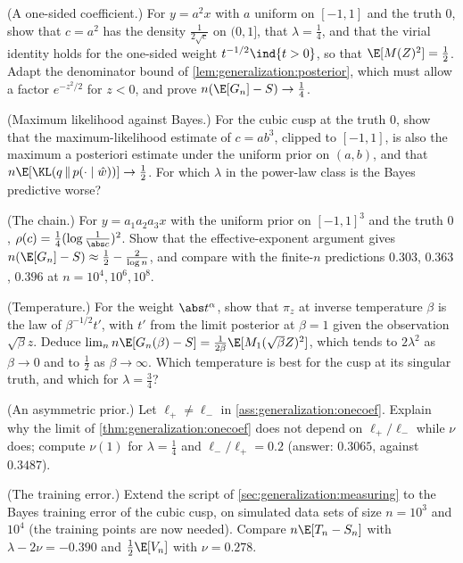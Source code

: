 \begin{refsection}
\begin{exercises}
\item \byhand (A one-sided coefficient.) For $y=a^2x$ with $a$ uniform on $[-1,1]$ and the truth $0$, show that $c=a^2$ has the density $\frac1{2\sqrt c}$ on $(0,1]$, that $\lambda=\frac14$, and that the virial identity holds for the one-sided weight $t^{-1/2}\ind\{t>0\}$, so that $\E[M(Z)^2]=\frac12$. \hard{} Adapt the denominator bound of \cref{lem:generalization:posterior}, which must allow a factor $e^{-z^2/2}$ for $z<0$, and prove $n(\E[G_n]-S)\to\frac14$. \label{ex:generalization:onesided}

\item \byhand (Maximum likelihood against Bayes.) For the cubic cusp at the truth $0$, show that the maximum-likelihood estimate of $c=ab^3$, clipped to $[-1,1]$, is also the maximum a posteriori estimate under the uniform prior on $(a,b)$, and that $n\E[\KL(q\,\|\,p(\cdot\mid\hat w))]\to\frac12$. For which $\lambda$ in the power-law class is the Bayes predictive worse?\label{ex:generalization:mle}

\item \byhand (The chain.) For $y=a_1a_2a_3x$ with the uniform prior on $[-1,1]^3$ and the truth $0$, $\rho(c)=\frac14(\log\frac1{\abs c})^2$. Show that the effective-exponent argument gives $n(\E[G_n]-S)\approx\frac12-\frac2{\log n}$, and compare with the finite-$n$ predictions $0.303$, $0.363$, $0.396$ at $n=10^4,10^6,10^8$.\label{ex:generalization:chain}

\item \variation (Temperature.) For the weight $\abs t^\alpha$, show that $\pi_z$ at inverse temperature $\beta$ is the law of $\beta^{-1/2}t'$, with $t'$ from the limit posterior at $\beta=1$ given the observation $\sqrt\beta z$. Deduce $\lim_nn\E[G_n(\beta)-S]=\frac1{2\beta}\E[M_1(\sqrt\beta Z)^2]$, which tends to $2\lambda^2$ as $\beta\to0$ and to $\frac12$ as $\beta\to\infty$. Which temperature is best for the cusp at its singular truth, and which for $\lambda=\frac34$?\label{ex:generalization:temperature}

\item \variation (An asymmetric prior.) Let $\ell_+\ne\ell_-$ in \cref{ass:generalization:onecoef}. Explain why the limit of \cref{thm:generalization:onecoef} does not depend on $\ell_+/\ell_-$ while $\nu$ does; compute $\nu(1)$ for $\lambda=\frac14$ and $\ell_-/\ell_+=0.2$ (answer: $0.3065$, against $0.3487$).\label{ex:generalization:asymmetric}

\item \measurement (The training error.) Extend the script of \cref{sec:generalization:measuring} to the Bayes training error of the cubic cusp, on simulated data sets of size $n=10^3$ and $10^4$ (the training points are now needed). Compare $n\E[T_n-S_n]$ with $\lambda-2\nu=-0.390$ and $\frac12\E[V_n]$ with $\nu=0.278$.\label{ex:generalization:training}


\end{exercises}
\end{refsection}
